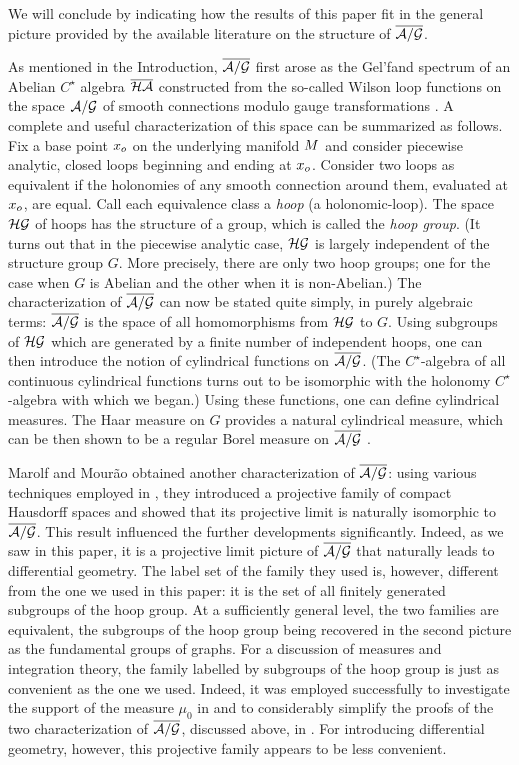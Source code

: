 We will conclude by indicating how the results of this paper fit
in the general picture provided by the available literature on the
structure of $\agb$. 

As mentioned in the Introduction, $\agb$ first arose as the Gel'fand
spectrum of an Abelian $C^\star$ algebra $\HAbar$ constructed from the
so-called Wilson loop functions on the space $\ag$ of smooth
connections modulo gauge transformations \cite{AI}. A complete and
useful characterization of this space \cite{AL1} can be summarized as
follows. Fix a base point $\xz$ on the underlying manifold $\S$ and
consider piecewise analytic, closed loops beginning and ending at
$\xz$. Consider two loops as equivalent if the holonomies of any
smooth connection around them, evaluated at $\xz$, are equal. Call
each equivalence class a {\it hoop} (a holonomic-loop). The space
$\HG$ of hoops has the structure of a group, which is called the {\it
hoop group}.  (It turns out that in the piecewise analytic case, $\HG$
is largely independent of the structure group $G$. More precisely,
there are only two hoop groups; one for the case when $G$ is Abelian
and the other when it is non-Abelian.) The characterization of $\agb$
can now be stated quite simply, in purely algebraic terms: $\agb$ is
the space of all homomorphisms from $\HG$ to $G$. Using subgroups of
$\HG$ which are generated by a finite number of independent hoops, one
can then introduce the notion of cylindrical functions on $\agb$. (The
$C^\star$-algebra of all continuous cylindrical functions turns out to
be isomorphic with the holonomy $C^\star$-algebra with which we
began.)  Using these functions, one can define cylindrical
measures. The Haar measure on $G$ provides a natural cylindrical
measure, which can be then shown to be a regular Borel measure on
$\agb$ \cite{AL1}.

Marolf and Mour\~ao \cite{MM} obtained another characterization of
$\agb$: using various techniques employed in \cite{AL1}, they
introduced a projective family of compact Hausdorff spaces and showed
that its projective limit is naturally isomorphic to $\agb$.  This
result influenced the further developments significantly.  Indeed, as
we saw in this paper, it is a projective limit picture of $\agb$ that
naturally leads to differential geometry.  The label set of the family
they used is, however, different from the one we used in this paper:
it is the set of all finitely generated subgroups of the hoop group.
At a sufficiently general level, the two families are equivalent, the
subgroups of the hoop group being recovered in the second picture as
the fundamental groups of graphs.  For a discussion of measures and
integration theory, the family labelled by subgroups of the hoop group
is just as convenient as the one we used. Indeed, it was employed
successfully to investigate the support of the measure $\mu_0$ in
\cite{MM} and to considerably simplify the proofs of the two
characterization of $\agb$, discussed above, in \cite {AL2}.  For
introducing differential geometry, however, this projective family
appears to be less convenient.

